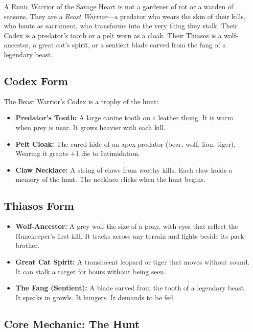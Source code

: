 A Runic Warrior of the Savage Heart is not a gardener of rot or a warden of seasons. They are a \textit{Beast Warrior}—a predator who wears the skin of their kills, who hunts as sacrament, who transforms into the very thing they stalk. Their Codex is a predator's tooth or a pelt worn as a cloak. Their Thiasos is a wolf-ancestor, a great cat's spirit, or a sentient blade carved from the fang of a legendary beast.

\subsection{Codex Form}

The Beast Warrior's Codex is a trophy of the hunt:

\begin{itemize}
\item \textbf{Predator's Tooth:} A large canine tooth on a leather thong. It is warm when prey is near. It grows heavier with each kill.
\item \textbf{Pelt Cloak:} The cured hide of an apex predator (bear, wolf, lion, tiger). Wearing it grants +1 die to Intimidation.
\item \textbf{Claw Necklace:} A string of claws from worthy kills. Each claw holds a memory of the hunt. The necklace clicks when the hunt begins.
\end{itemize}

\subsection{Thiasos Form}

\begin{itemize}
\item \textbf{Wolf-Ancestor:} A grey wolf the size of a pony, with eyes that reflect the Runekeeper's first kill. It tracks across any terrain and fights beside its pack-brother.
\item \textbf{Great Cat Spirit:} A translucent leopard or tiger that moves without sound. It can stalk a target for hours without being seen.
\item \textbf{The Fang (Sentient):} A blade carved from the tooth of a legendary beast. It speaks in growls. It hungers. It demands to be fed.
\end{itemize}

\subsection{Core Mechanic: The Hunt}

